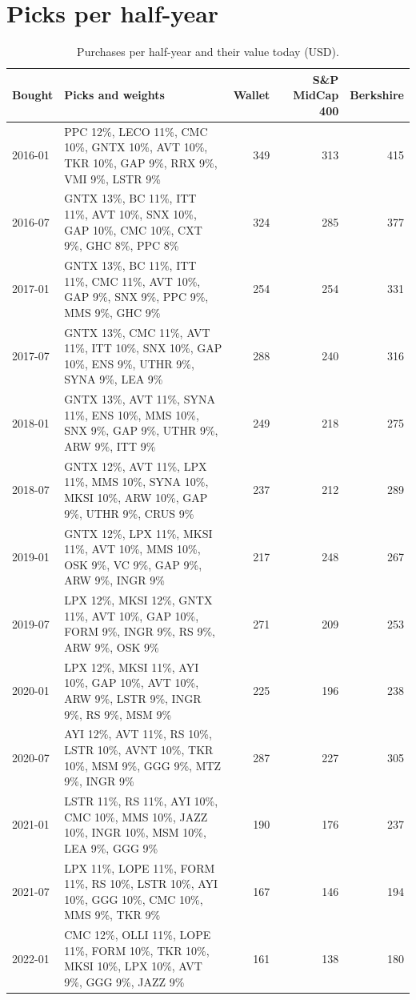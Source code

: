 \documentclass[11pt,a4paper]{article}
\begin{document}
\section{Picks per half-year}
\begin{table}[H]
\centering
\small
\caption{Purchases per half-year and their value today (USD).}\label{tab:picks}
\begin{tabular}{l p{9.2cm} r r r }
\hline
Bought & Picks and weights & Wallet & S\&P MidCap 400 & Berkshire \\
\hline
2016-01 & PPC 12\%, LECO 11\%, CMC 10\%, GNTX 10\%, AVT 10\%, TKR 10\%, GAP 9\%, RRX 9\%, VMI 9\%, LSTR 9\% & 349 & 313 & 415 \\
2016-07 & GNTX 13\%, BC 11\%, ITT 11\%, AVT 10\%, SNX 10\%, GAP 10\%, CMC 10\%, CXT 9\%, GHC 8\%, PPC 8\% & 324 & 285 & 377 \\
2017-01 & GNTX 13\%, BC 11\%, ITT 11\%, CMC 11\%, AVT 10\%, GAP 9\%, SNX 9\%, PPC 9\%, MMS 9\%, GHC 9\% & 254 & 254 & 331 \\
2017-07 & GNTX 13\%, CMC 11\%, AVT 11\%, ITT 10\%, SNX 10\%, GAP 10\%, ENS 9\%, UTHR 9\%, SYNA 9\%, LEA 9\% & 288 & 240 & 316 \\
2018-01 & GNTX 13\%, AVT 11\%, SYNA 11\%, ENS 10\%, MMS 10\%, SNX 9\%, GAP 9\%, UTHR 9\%, ARW 9\%, ITT 9\% & 249 & 218 & 275 \\
2018-07 & GNTX 12\%, AVT 11\%, LPX 11\%, MMS 10\%, SYNA 10\%, MKSI 10\%, ARW 10\%, GAP 9\%, UTHR 9\%, CRUS 9\% & 237 & 212 & 289 \\
2019-01 & GNTX 12\%, LPX 11\%, MKSI 11\%, AVT 10\%, MMS 10\%, OSK 9\%, VC 9\%, GAP 9\%, ARW 9\%, INGR 9\% & 217 & 248 & 267 \\
2019-07 & LPX 12\%, MKSI 12\%, GNTX 11\%, AVT 10\%, GAP 10\%, FORM 9\%, INGR 9\%, RS 9\%, ARW 9\%, OSK 9\% & 271 & 209 & 253 \\
2020-01 & LPX 12\%, MKSI 11\%, AYI 10\%, GAP 10\%, AVT 10\%, ARW 9\%, LSTR 9\%, INGR 9\%, RS 9\%, MSM 9\% & 225 & 196 & 238 \\
2020-07 & AYI 12\%, AVT 11\%, RS 10\%, LSTR 10\%, AVNT 10\%, TKR 10\%, MSM 9\%, GGG 9\%, MTZ 9\%, INGR 9\% & 287 & 227 & 305 \\
2021-01 & LSTR 11\%, RS 11\%, AYI 10\%, CMC 10\%, MMS 10\%, JAZZ 10\%, INGR 10\%, MSM 10\%, LEA 9\%, GGG 9\% & 190 & 176 & 237 \\
2021-07 & LPX 11\%, LOPE 11\%, FORM 11\%, RS 10\%, LSTR 10\%, AYI 10\%, GGG 10\%, CMC 10\%, MMS 9\%, TKR 9\% & 167 & 146 & 194 \\
2022-01 & CMC 12\%, OLLI 11\%, LOPE 11\%, FORM 10\%, TKR 10\%, MKSI 10\%, LPX 10\%, AVT 9\%, GGG 9\%, JAZZ 9\% & 161 & 138 & 180 \\

\end{tabular}
\end{table}
\end{document}
